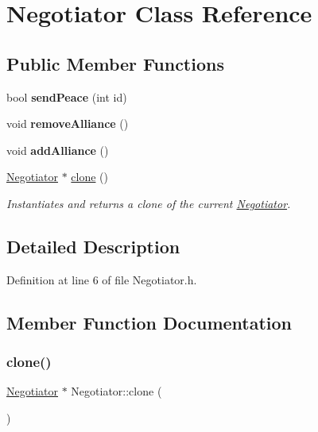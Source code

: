 \hypertarget{classNegotiator}{}\section{Negotiator Class Reference}
\label{classNegotiator}
\subsection*{Public Member Functions}
\begin{DoxyCompactItemize}
\item 
\mbox{\label{classNegotiator_a30efddcdba1469a147a7429a540033b1}} 
bool {\bfseries send\+Peace} (int id)
\item 
\mbox{\label{classNegotiator_a6f738ecfc7adc21b0f553d21c61d2918}} 
void {\bfseries remove\+Alliance} ()
\item 
\mbox{\label{classNegotiator_a21f5db9200fece88e3d7e63ed58b0499}} 
void {\bfseries add\+Alliance} ()
\item 
\hyperlink{classNegotiator}{Negotiator} $\ast$ \hyperlink{classNegotiator_adafefed500d3f36649696b3d2fc92be7}{clone} ()
\begin{DoxyCompactList}\small\item\em Instantiates and returns a clone of the current \hyperlink{classNegotiator}{Negotiator}. \end{DoxyCompactList}\end{DoxyCompactItemize}


\subsection{Detailed Description}


Definition at line 6 of file Negotiator.\+h.



\subsection{Member Function Documentation}
\mbox{\label{classNegotiator_adafefed500d3f36649696b3d2fc92be7}} 
\subsubsection{\texorpdfstring{clone()}{clone()}}
{\footnotesize\ttfamily \hyperlink{classNegotiator}{Negotiator} $\ast$ Negotiator\+::clone (\begin{DoxyParamCaption}{ }\end{DoxyParamCaption})}



